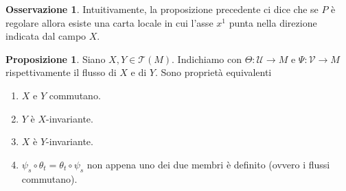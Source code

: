 \documentclass[a4paper,11pt]{article}
\theoremstyle{definition}
\newtheorem{osservazione}{Osservazione}[section]
\theoremstyle{theorem}
\newtheorem{proposizione}{Proposizione}[section]
\begin{document}
\begin{osservazione}
	Intuitivamente, la proposizione precedente ci dice che se $P$ è regolare allora esiste una carta locale in cui l'asse $x^1$ punta nella direzione indicata dal campo $X$.
\end{osservazione}
\begin{proposizione}
	Siano $X,Y\in\mathcal{T}(M)$. Indichiamo con $\Theta\colon\mathcal{U}\to M$ e $\Psi\colon\mathcal{V}\to M$ rispettivamente il flusso di $X$ e di $Y$. Sono proprietà equivalenti
	\begin{enumerate}
		\item $X$ e $Y$ commutano.
		\item $Y$ è $X$-invariante.
		\item $X$ è $Y$-invariante.
		\item $\psi_s\circ\theta_t=\theta_t\circ\psi_s$ non appena uno dei due membri è definito (ovvero i flussi commutano).
	\end{enumerate}
\end{proposizione}
\end{document}
